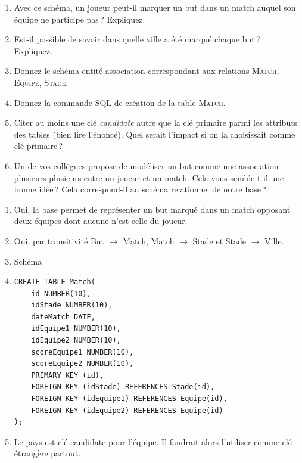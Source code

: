 \begin{enumerate}
    
    \item Avec ce schéma, un joueur peut-il marquer un but dans un match auquel
    son équipe ne participe pas\,? Expliquez.

    \item Est-il possible de savoir dans quelle ville a été marqué chaque but\,? Expliquez.
    
     \item Donnez le schéma entité-association correspondant aux relations \textsc{Match}, \textsc{Equipe},
          \textsc{Stade}.
          
     \item Donnez la commande SQL de création de la table \textsc{Match}.
     
     \item Citer au moins une clé \emph{candidate} autre que la clé primaire 
     parmi les attributs des tables (bien lire l'énoncé). 
       Quel serait l'impact si on la choisissait comme clé primaire\,?
       
     \item Un de vos collègues propose de modéliser un but comme une association plusieurs-plusieurs
     entre un joueur et un match. Cela vous semble-t-il une bonne idée\,? Cela correspond-il 
     au schéma relationnel de notre base\,?
\end{enumerate}

\begin{solution}
\begin{enumerate}
  \item Oui, la base permet de représenter un but marqué dans un match opposant deux équipes
       dont aucune n'est celle du joueur.
  \item Oui, par transitivité But $\to$ Match, Match $\to$ Stade  et Stade $\to$ Ville.
  \item Schéma
  \item 

\begin{verbatim}
CREATE TABLE Match(
    id NUMBER(10), 
    idStade NUMBER(10), 
    dateMatch DATE, 
    idEquipe1 NUMBER(10), 
    idEquipe2 NUMBER(10), 
    scoreEquipe1 NUMBER(10), 
    scoreEquipe2 NUMBER(10),
    PRIMARY KEY (id),
    FOREIGN KEY (idStade) REFERENCES Stade(id),
    FOREIGN KEY (idEquipe1) REFERENCES Equipe(id),
    FOREIGN KEY (idEquipe2) REFERENCES Equipe(id)
);
\end{verbatim}
  
  \item Le pays est clé candidate pour l'équipe. Il faudrait alors l'utiliser comme clé étrangère 
     partout.
     
\end{enumerate}

\end{solution}

